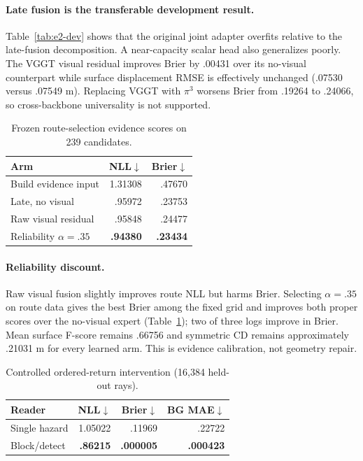 \paragraph{Late fusion is the transferable development result.}
Table~\ref{tab:e2-dev} shows that the original joint adapter overfits relative to the
late-fusion decomposition. A near-capacity scalar head also generalizes poorly. The
VGGT visual residual improves Brier by .00431 over its no-visual counterpart while
surface displacement RMSE is effectively unchanged (.07530 versus .07549 m). Replacing
VGGT with $\pi^3$ worsens Brier from .19264 to .24066, so cross-backbone universality is
not supported.

\begin{table}[t]
  \centering
  \caption{Frozen route-selection evidence scores on 239 candidates.}
  \label{tab:e5-route}
  \small
  \begin{tabular}{lrr}
    \toprule
    Arm & NLL$\downarrow$ & Brier$\downarrow$ \\
    \midrule
    Build evidence input & 1.31308 & .47670 \\
    Late, no visual & .95972 & .23753 \\
    Raw visual residual & .95848 & .24477 \\
    Reliability $\alpha=.35$ & \textbf{.94380} & \textbf{.23434} \\
    \bottomrule
  \end{tabular}
\end{table}

\paragraph{Reliability discount.}
Raw visual fusion slightly improves route NLL but harms Brier. Selecting $\alpha=.35$
on route data gives the best Brier among the fixed grid and improves both proper scores
over the no-visual expert (Table~\ref{tab:e5-route}); two of three logs improve in
Brier. Mean surface F-score remains .66756 and symmetric CD remains approximately
.21031 m for every learned arm. This is evidence calibration, not geometry repair.

\begin{table}[t]
  \centering
  \caption{Controlled ordered-return intervention (16,384 held-out rays).}
  \label{tab:ordered}
  \small
  \begin{tabular}{lrrr}
    \toprule
    Reader & NLL$\downarrow$ & Brier$\downarrow$ & BG MAE$\downarrow$ \\
    \midrule
    Single hazard & 1.05022 & .11969 & .22722 \\
    Block/detect & \textbf{.86215} & \textbf{.000005} & \textbf{.000423} \\
    \bottomrule
  \end{tabular}
\end{table}

